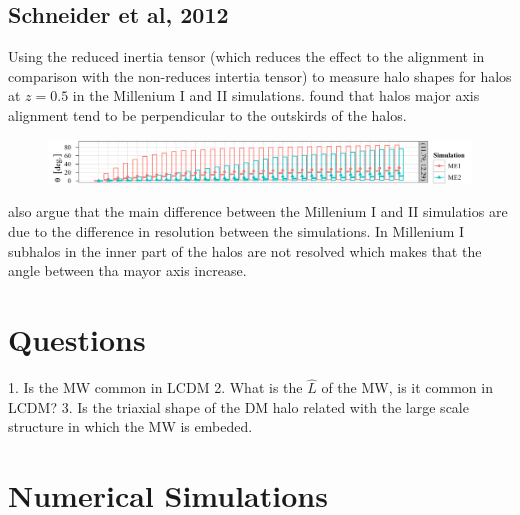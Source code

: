 \documentclass[16pt]{article}
\begin{document}
\subsection{Schneider et al, 2012}

Using the reduced inertia tensor (which reduces the effect to the alignment
in comparison with the non-reduces intertia tensor) to measure halo 
shapes for halos
at $z=0.5$ in the Millenium I and II simulations. \citep{scheider12}
found that halos major axis alignment tend to be perpendicular to the outskirds
of the halos.  

\begin{figure}[H]
\includegraphics[scale=0.5]{schneideralignments.png}
\end{figure}

\citep{schneider12} also argue that the main difference between the 
Millenium I and II simulatios are due to the difference in resolution 
between the simulations. In Millenium I subhalos in the inner part 
of the halos are not resolved which makes that the angle between 
tha mayor axis increase. 

\section{Questions}

1. Is the MW common in LCDM
2. What is the $\hat{L}$ of the MW, is it common in LCDM?
3. Is the triaxial shape of the DM halo related with the large
scale structure in which the MW is embeded.


\section{Numerical Simulations}



\end{document}
